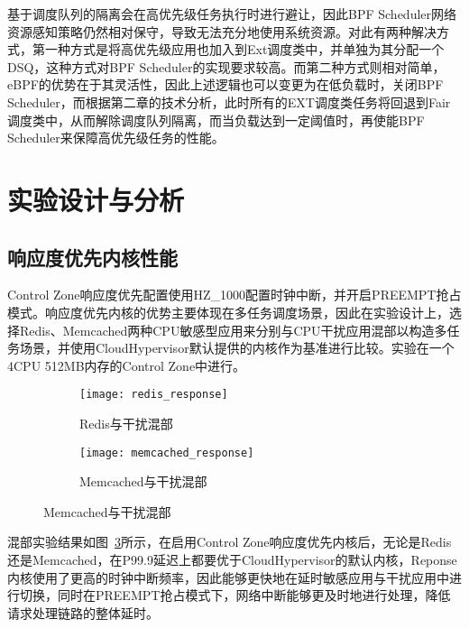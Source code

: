 基于调度队列的隔离会在高优先级任务执行时进行避让，因此BPF Scheduler网络资源感知策略仍然相对保守，导致无法充分地使用系统资源。对此有两种解决方式，第一种方式是将高优先级应用也加入到Ext调度类中，并单独为其分配一个DSQ，这种方式对BPF Scheduler的实现要求较高。而第二种方式则相对简单，eBPF的优势在于其灵活性，因此上述逻辑也可以变更为在低负载时，关闭BPF Scheduler，而根据第二章的技术分析，此时所有的EXT调度类任务将回退到Fair调度类中，从而解除调度队列隔离，而当负载达到一定阈值时，再使能BPF Scheduler来保障高优先级任务的性能。


\section{实验设计与分析}

\subsection{响应度优先内核性能}


Control Zone响应度优先配置使用HZ\_1000配置时钟中断，并开启PREEMPT抢占模式。响应度优先内核的优势主要体现在多任务调度场景，因此在实验设计上，选择Redis、Memcached两种CPU敏感型应用来分别与CPU干扰应用混部以构造多任务场景，并使用CloudHypervisor默认提供的内核作为基准进行比较。实验在一个4CPU 512MB内存的Control Zone中进行。

\begin{figure}[H]
    \centering
    \begin{subfigure}[b]{0.49\textwidth}
      \texttt{[image: redis\_response]}
      \caption{Redis与干扰混部}
      \label{fig:redis_response}
    \end{subfigure}
    \begin{subfigure}[b]{0.49\textwidth}
      \texttt{[image: memcached\_response]}
      \caption{Memcached与干扰混部}
      \label{fig:memcached_response}
    \end{subfigure}
    \label{fig:lc_response}
\end{figure}

混部实验结果如图~\ref{fig:lc_response}所示，在启用Control Zone响应度优先内核后，无论是Redis还是Memcached，在P99.9延迟上都要优于CloudHypervisor的默认内核，Reponse内核使用了更高的时钟中断频率，因此能够更快地在延时敏感应用与干扰应用中进行切换，同时在PREEMPT抢占模式下，网络中断能够更及时地进行处理，降低请求处理链路的整体延时。


